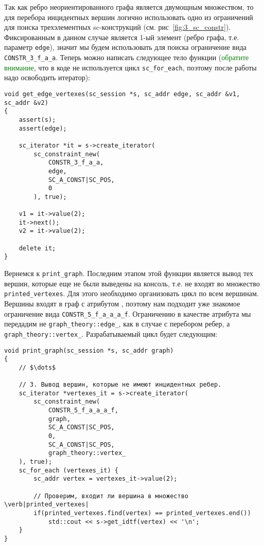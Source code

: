 Так как ребро неориентированного графа является двумощным множеством,
то для перебора инцидентных вершин логично использовать одно из
ограничений для поиска трехэлементных sc-конструкций
(см. рис~\ref{fig:3_sc_constr}). Фиксированным в данном случае
является 1-ый элемент (ребро графа, т.е. параметр \lstinline|edge|),
значит мы будем использовать для поиска ограничение вида
\lstinline|CONSTR_3_f_a_a|. Теперь можно написать следующее тело
функции (\textcolor{green}{обратите внимание}, что в коде не
используется цикл \lstinline|sc_for_each|, поэтому после работы надо
освободить итератор):
\begin{lstlisting}[texcl]
void get_edge_vertexes(sc_session *s, sc_addr edge, sc_addr &v1, sc_addr &v2)
{
    assert(s);
    assert(edge);

    sc_iterator *it = s->create_iterator(
        sc_constraint_new(
            CONSTR_3_f_a_a,
            edge,
            SC_A_CONST|SC_POS,
            0
        ), true);

    v1 = it->value(2);
    it->next();
    v2 = it->value(2);

    delete it;
}
\end{lstlisting}

Вернемся к \lstinline|print_graph|. Последним этапом этой функции
является вывод тех вершин, которые еще не были выведены на консоль,
т.е. не входят во множество \lstinline|printed_vertexes|. Для этого
необходимо организовать цикл по всем вершинам.  Вершины входят в граф
с атрибутом , поэтому нам подходит уже знакомое
ограничение вида \lstinline|CONSTR_5_f_a_a_a_f|. Ограничению в
качестве атрибута мы передадим не \lstinline|graph_theory::edge_|, как
в случае с перебором ребер, а
\lstinline|graph_theory::vertex_|. Разрабатываемый цикл будет
следующим:
\begin{lstlisting}[texcl]
void print_graph(sc_session *s, sc_addr graph)
{
    // $\dots$

    // 3. Вывод вершин, которые не имеют инцидентных ребер.
    sc_iterator *vertexes_it = s->create_iterator(
        sc_constraint_new(
            CONSTR_5_f_a_a_a_f,
            graph,
            SC_A_CONST|SC_POS,
            0,
            SC_A_CONST|SC_POS,
            graph_theory::vertex_
    ), true);
    sc_for_each (vertexes_it) {
        sc_addr vertex = vertexes_it->value(2);

        // Проверим, входит ли вершина в множество \verb|printed_vertexes|
        if(printed_vertexes.find(vertex) == printed_vertexes.end())
            std::cout << s->get_idtf(vertex) << '\n';
    }
}
\end{lstlisting}

